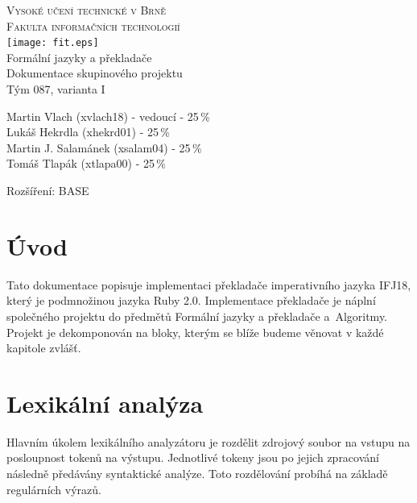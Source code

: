 \documentclass[12pt, a4paper]{article}
\begin{document}
\begin{titlepage}
    \begin{center}
    	{\textsc{\Huge Vysoké učení technické v Brně}} \\[0,7em]
    	 \textsc{{\huge Fakulta informačních technologií}}\\[90px]
		\texttt{[image: fit.eps]}\\   	
    	{\LARGE Formální jazyky a překladače\\[0,1em]
		{\Huge  Dokumentace skupinového projektu\\[0,3em]}}
		{\LARGE Tým 087, varianta I}		
	\end{center}
	\begin{flushleft}
	\begin{Large}
		Martin Vlach (xvlach18) - vedoucí - 25\,\%\\
		Lukáš Hekrdla (xhekrd01) - 25\,\%\\
		Martin J. Salamánek (xsalam04) - 25\,\%\\
		Tomáš Tlapák (xtlapa00) - 25\,\% \newline
		
		Rozšíření: BASE\\
	\end{Large}	
	\end{flushleft}
\end{titlepage}

\section{Úvod}
Tato dokumentace popisuje implementaci překladače imperativního jazyka IFJ18, který je podmnožinou jazyka Ruby 2.0.
Implementace překladače je náplní společného projektu do předmětů Formální jazyky a překladače a~Algoritmy. Projekt je dekomponován na bloky, kterým se blíže budeme věnovat v každé kapitole zvlášť.\par


\section{Lexikální analýza}
Hlavním úkolem lexikálního analyzátoru je rozdělit zdrojový soubor na vstupu na posloupnost tokenů na výstupu. Jednotlivé tokeny jsou po jejich zpracování následně předávány syntaktické analýze. Toto rozdělování probíhá na základě regulárních výrazů.  \par
\end{document}
